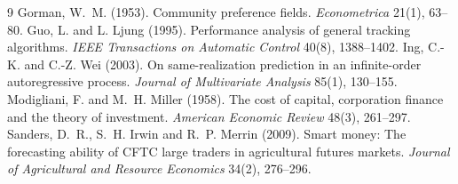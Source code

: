 \documentclass[11pt]{article}
\theoremstyle{remark}\newtheorem{remark}[theorem]{Remark}
\begin{document}
\begin{thebibliography}{9}
 Gorman, W.~M. (1953). Community preference fields. \emph{Econometrica} 21(1), 63--80.
 Guo, L. and L. Ljung (1995). Performance analysis of general tracking algorithms. \emph{IEEE Transactions on Automatic Control} 40(8), 1388--1402.
 Ing, C.-K. and C.-Z. Wei (2003). On same-realization prediction in an infinite-order autoregressive process. \emph{Journal of Multivariate Analysis} 85(1), 130--155.
 Modigliani, F. and M.~H. Miller (1958). The cost of capital, corporation finance and the theory of investment. \emph{American Economic Review} 48(3), 261--297.
 Sanders, D.~R., S.~H. Irwin and R.~P. Merrin (2009). Smart money: The forecasting ability of CFTC large traders in agricultural futures markets. \emph{Journal of Agricultural and Resource Economics} 34(2), 276--296.
\end{thebibliography}
\end{document}
